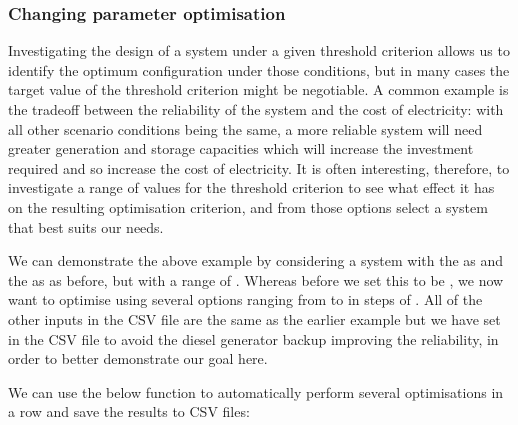 \documentclass[letterpaper,10pt,english]{sphinxmanual}
\begin{document}
\subsubsection{Changing parameter optimisation}
\label{\detokenize{optimisation:changing-parameter-optimisation}}
\sphinxAtStartPar
Investigating the design of a system under a given threshold criterion
allows us to identify the optimum configuration under those conditions,
but in many cases the target value of the threshold criterion might be
negotiable. A common example is the tradeoff between the reliability of
the system and the cost of electricity: with all other scenario
conditions being the same, a more reliable system will need greater
generation and storage capacities which will increase the investment
required and so increase the cost of electricity. It is often
interesting, therefore, to investigate a range of values for the
threshold criterion to see what effect it has on the resulting
optimisation criterion, and from those options select a system that best
suits our needs.

\sphinxAtStartPar
We can demonstrate the above example by considering a system with the
 as  and the
 as  as before, but with a range of
. Whereas before we set this to be , we now
want to optimise using several options ranging from  to 
in steps of . All of the other inputs in the
 CSV file are the same as the earlier
example but we have set 
in the  CSV file to avoid the diesel generator
backup improving the reliability, in order to better demonstrate our
goal here.

\sphinxAtStartPar
We can use the below function to automatically perform several
optimisations in a row and save the results to CSV files:

\begin{sphinxVerbatim}[commandchars=\\\{\}]
  
      \PYG{p}{[}\PYG{p}{]}
      
\end{sphinxVerbatim}
\end{document}
